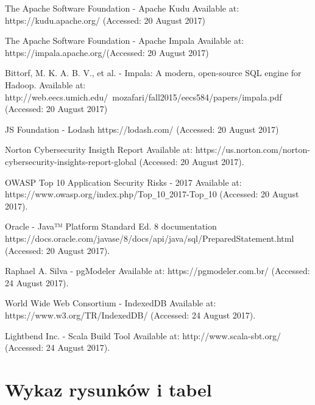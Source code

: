 \documentclass[a4paper,12pt,twoside]{article}
\begin{document}
\begin{thebibliography}{99}
The Apache Software Foundation - Apache Kudu Available at:
https://kudu.apache.org/ (Accessed: 20 August 2017)

The Apache Software Foundation - Apache Impala Available at:
https://impala.apache.org/(Accessed: 20 August 2017)

Bittorf, M. K. A. B. V., et al. - Impala: A modern, open-source SQL engine for Hadoop.
Available at: http://web.eecs.umich.edu/~mozafari/fall2015/eecs584/papers/impala.pdf (Accessed: 20 August 2017)

JS Foundation - Lodash
https://lodash.com/ (Accessed: 20 August 2017)

Norton Cybersecurity Insigth Report 
Available at: https://us.norton.com/norton-cybersecurity-insights-report-global (Accessed: 20 August 2017).

OWASP Top 10 Application Security Risks - 2017 Available at: 
https://www.owasp.org/index.php/Top\verb!_!10\verb!_!2017-Top\verb!_!10 (Accessed: 20 August 2017).

Oracle - Java™ Platform Standard Ed. 8 documentation
https://docs.oracle.com/javase/8/docs/api/java/sql/PreparedStatement.html (Accessed: 20 August 2017).

Raphael A. Silva - pgModeler Available at: https://pgmodeler.com.br/
(Accessed: 24 August 2017).

World Wide Web Consortium - IndexedDB Available at: https://www.w3.org/TR/IndexedDB/
(Accessed: 24 August 2017).

Lightbend Inc. - Scala Build Tool 
 Available at: http://www.scala-sbt.org/
(Accessed: 24 August 2017).
\end{thebibliography}

\newpage
\section*{Wykaz rysunków i tabel}
\listoffigures
\listoftables
\end{document}

